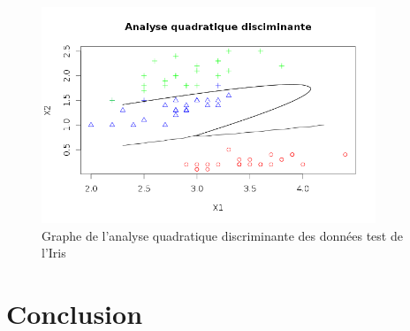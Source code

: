 \documentclass[a4paper,11pt]{article}
\begin{document}
  \begin{figure}[h]
   \center
   \includegraphics[width=10cm]{iris_quadratique.png}
   \caption{Graphe de l'analyse quadratique discriminante des données test de l'Iris}
  \end{figure}
  
  
  \section*{Conclusion}
\end{document}
